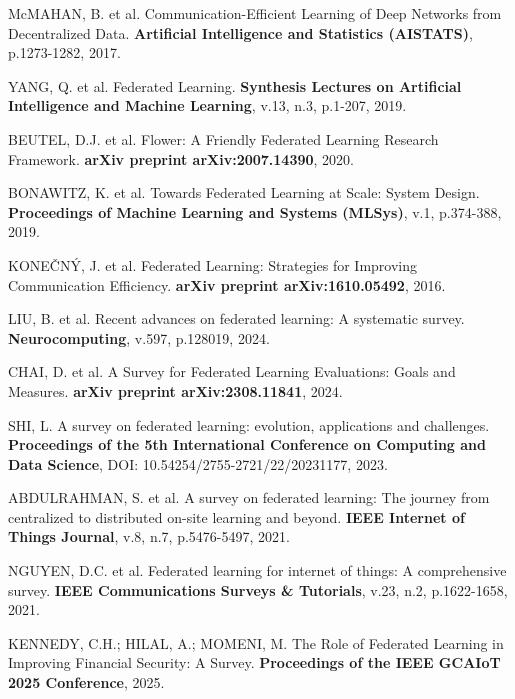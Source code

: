 

McMAHAN, B. et al.
Communication-Efficient Learning of Deep Networks from Decentralized Data.
{\bf Artificial Intelligence and Statistics (AISTATS)},
p.1273-1282, 2017.

YANG, Q. et al.
Federated Learning.
{\bf Synthesis Lectures on Artificial Intelligence and Machine Learning},
v.13, n.3, p.1-207, 2019.

BEUTEL, D.J. et al.
Flower: A Friendly Federated Learning Research Framework.
{\bf arXiv preprint arXiv:2007.14390}, 2020.

BONAWITZ, K. et al.
Towards Federated Learning at Scale: System Design.
{\bf Proceedings of Machine Learning and Systems (MLSys)},
v.1, p.374-388, 2019.

KONEČNÝ, J. et al.
Federated Learning: Strategies for Improving Communication Efficiency.
{\bf arXiv preprint arXiv:1610.05492}, 2016.


LIU, B. et al.
Recent advances on federated learning: A systematic survey.
{\bf Neurocomputing},
v.597, p.128019, 2024.

CHAI, D. et al.
A Survey for Federated Learning Evaluations: Goals and Measures.
{\bf arXiv preprint arXiv:2308.11841}, 2024.

SHI, L.
A survey on federated learning: evolution, applications and challenges.
{\bf Proceedings of the 5th International Conference on Computing and Data Science},
DOI: 10.54254/2755-2721/22/20231177, 2023.

ABDULRAHMAN, S. et al.
A survey on federated learning: The journey from centralized to distributed on-site learning and beyond.
{\bf IEEE Internet of Things Journal},
v.8, n.7, p.5476-5497, 2021.

NGUYEN, D.C. et al.
Federated learning for internet of things: A comprehensive survey.
{\bf IEEE Communications Surveys \& Tutorials},
v.23, n.2, p.1622-1658, 2021.


KENNEDY, C.H.; HILAL, A.; MOMENI, M.
The Role of Federated Learning in Improving Financial Security: A Survey.
{\bf Proceedings of the IEEE GCAIoT 2025 Conference}, 2025.

